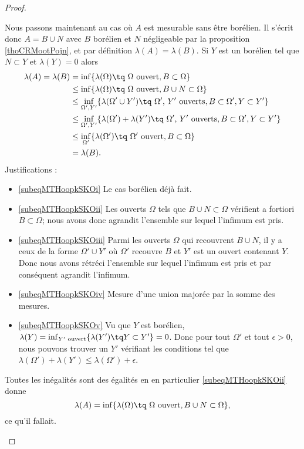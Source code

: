 \begin{proof}
\begin{subproof}
    Nous passons maintenant au cas où \( A \) est mesurable sans être borélien. Il s'écrit donc \( A=B\cup N\) avec \( B\) borélien et \( N\) négligeable par la proposition \ref{thoCRMootPojn}, et par définition \( \lambda(A)=\lambda(B)\). Si \( Y\) est un borélien tel que \( N\subset Y\) et \( \lambda(Y)=0\) alors
    \begin{subequations}
        \begin{align}
            \lambda(A)=\lambda(B)&=\inf\{ \lambda(\Omega)\tq \text{ } \Omega\text{ ouvert}, B\subset\Omega \}\label{subeqMTHoopkSKOi}\\
            &\leq\inf\{ \lambda(\Omega)\tq \text{ } \Omega\text{ ouvert}, B\cup N\subset\Omega \}  \label{subeqMTHoopkSKOii}\\
            &\leq\inf_{\Omega',Y'}\{ \lambda(\Omega'\cup Y')\tq \text{ } \Omega'\text{, } Y'\text{ ouverts}, B\subset\Omega', Y\subset Y' \}\label{subeqMTHoopkSKOiii}\\
            &\leq\inf_{\Omega',Y'}\{ \lambda(\Omega')+\lambda(Y')\tq \text{ } \Omega'\text{, } Y'\text{ ouverts},  B\subset\Omega',Y\subset Y' \}\label{subeqMTHoopkSKOiv}\\
            &\leq\inf_{\Omega'}\{ \lambda(\Omega')\tq \text{ } \Omega'\text{ ouvert},  B\subset\Omega \}\label{subeqMTHoopkSKOv}\\
            &=\lambda(B).
        \end{align}
    \end{subequations}
    Justifications :
    \begin{itemize}
        \item \eqref{subeqMTHoopkSKOi} Le cas borélien déjà fait.
        \item \eqref{subeqMTHoopkSKOii} Les ouverts \( \Omega\) tels que \( B\cup N\subset \Omega\) vérifient a fortiori \( B\subset \Omega\); nous avons donc agrandit l'ensemble sur lequel l'infimum est pris.
        \item \eqref{subeqMTHoopkSKOiii} Parmi les ouverts \( \Omega\) qui recouvrent \( B\cup N\), il y a ceux de la forme \( \Omega'\cup Y'\) où \( \Omega'\) recouvre \( B\) et \( Y'\) est un ouvert contenant \( Y\). Donc nous avons rétréci l'ensemble sur lequel l'infimum est pris et par conséquent agrandit l'infimum.
        \item \eqref{subeqMTHoopkSKOiv} Mesure d'une union majorée par la somme des mesures.
        \item \eqref{subeqMTHoopkSKOv} Vu que \( Y\) est borélien, \( \lambda(Y)=\inf_{ Y'\text{ ouvert}}\{ \lambda(Y')\tq Y\subset Y' \}=0\). Donc pour tout \( \Omega'\) et tout \( \epsilon>0\), nous pouvons trouver un \( Y'\) vérifiant les conditions tel que \( \lambda(\Omega')+\lambda(Y')\leq \lambda(\Omega')+\epsilon\).
    \end{itemize}
    Toutes les inégalités sont des égalités en en particulier \eqref{subeqMTHoopkSKOii} donne
    \begin{equation}
        \lambda(A)=\inf\{ \lambda(\Omega)\tq \text{ } \Omega\text{ ouvert}, B\cup N\subset\Omega \},
    \end{equation}
    ce qu'il fallait.
    \end{subproof}
    

\end{proof}
